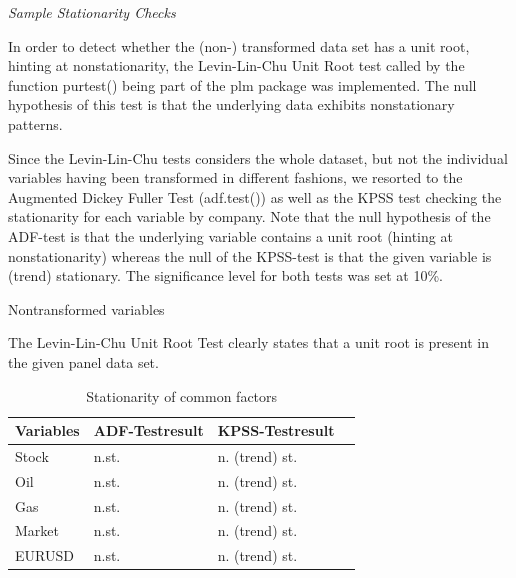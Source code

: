 \documentclass[a4paper]{article}
\begin{document}
\emph{Sample Stationarity Checks}

In order to detect whether the (non-) transformed data set has a unit root, hinting at nonstationarity, the Levin-Lin-Chu Unit Root test called by the function purtest() being part of the plm package was implemented. The null hypothesis of this test is that the underlying data exhibits nonstationary patterns. 

Since the Levin-Lin-Chu tests considers the whole dataset, but not the individual variables having been transformed in different fashions, we resorted to the Augmented Dickey Fuller Test (adf.test()) as well as the KPSS test checking the stationarity for each variable by company. Note that the null hypothesis of the ADF-test is that the underlying variable contains a unit root (hinting at nonstationarity) whereas the null of the KPSS-test is that the given variable is (trend) stationary. The significance level for both tests was set at 10\%. 

Nontransformed variables

The Levin-Lin-Chu Unit Root Test clearly states that a unit root is present in the given panel data set. 

\begin{table}[ht] 
\centering
\begin{tabular}{l|l|ll}
\hline
\hline
\multicolumn{1}{c|}{Variables} & \multicolumn{1}{c|}{ADF-Testresult} & \multicolumn{1}{c}{KPSS-Testresult} \\
\hline
Stock & n.st. & n. (trend) st. \\ 
Oil & n.st. &  n. (trend) st. \\ 
Gas & n.st. & n. (trend) st. \\ 
Market & n.st. & n. (trend) st. \\ 
EURUSD & n.st. & n. (trend) st. \\ 
\hline
\hline
\end{tabular}
\label{}
\caption{Stationarity of common factors} 
\end{table}
\end{document}
